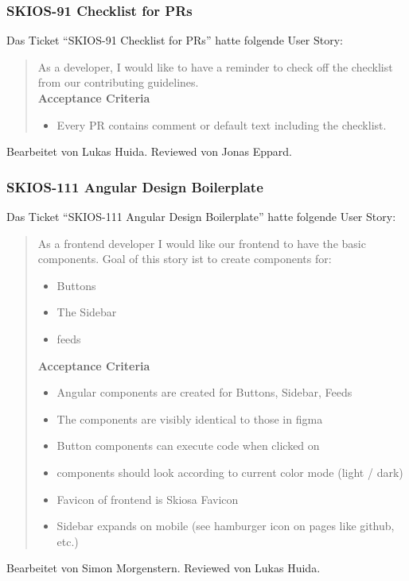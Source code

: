 \subsubsection{SKIOS-91 Checklist for PRs}
Das Ticket \enquote{SKIOS-91 Checklist for PRs} hatte folgende User Story:
\begin{quotation}
    As a developer, I would like to have a reminder to check off the checklist from our contributing guidelines. \\
    \textbf{Acceptance Criteria}
    \begin{itemize}
        \item Every PR contains comment or default text including the checklist.
    \end{itemize}
\end{quotation}
Bearbeitet von Lukas Huida.
Reviewed von Jonas Eppard.

\subsubsection{SKIOS-111 Angular Design Boilerplate}
Das Ticket \enquote{SKIOS-111 Angular Design Boilerplate} hatte folgende User Story:
\begin{quotation}
    As a frontend developer I would like our frontend to have the basic components.
    Goal of this story ist to create components for:
    \begin{itemize}
        \item Buttons
        \item The Sidebar
        \item feeds
    \end{itemize}
\textbf{Acceptance Criteria}
\begin{itemize}
    \item Angular components are created for Buttons, Sidebar, Feeds
    \item The components are visibly identical to those in figma
    \item Button components can execute code when clicked on
    \item components should look according to current color mode (light / dark)
    \item Favicon of frontend is Skiosa Favicon
    \item Sidebar expands on mobile (see hamburger icon on pages like github, etc.)
\end{itemize}
\end{quotation}
Bearbeitet von Simon Morgenstern.
Reviewed von Lukas Huida.

